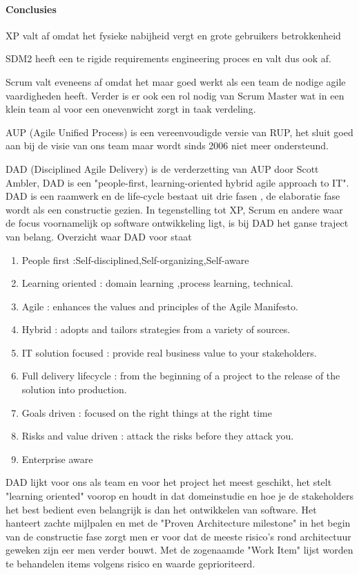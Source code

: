	
\paragraph{Conclusies}
\begin{description}
\item XP valt af omdat het fysieke nabijheid vergt en grote gebruikers betrokkenheid
\item SDM2 heeft een te rigide requirements engineering proces en valt dus ook af.
\item Scrum valt eveneens af omdat het maar goed werkt als een team de nodige agile vaardigheden heeft. Verder is er ook een rol nodig van Scrum Master wat in een klein team al voor een onevenwicht zorgt in taak verdeling.
\item AUP (Agile Unified Process) is een vereenvoudigde versie van RUP, het sluit goed aan bij de visie van ons team maar wordt sinds 2006 niet meer ondersteund. 
\item DAD (Disciplined Agile Delivery) is de verderzetting van AUP door Scott Ambler, DAD is een "people-first, learning-oriented hybrid agile approach to IT". DAD is een raamwerk en de life-cycle bestaat uit drie fasen , de elaboratie fase wordt als een constructie gezien. In tegenstelling tot XP, Scrum en andere waar de focus voornamelijk op software ontwikkeling ligt, is bij DAD het ganse traject van belang.
Overzicht waar DAD voor staat 
	\begin{enumerate}
		\item People first :Self-disciplined,Self-organizing,Self-aware
		\item Learning oriented : domain learning ,process learning, technical.
		\item Agile : enhances the values and principles of the Agile Manifesto.
		\item Hybrid : adopts and tailors strategies from a variety of sources.
		\item IT solution focused :  provide real business value to your stakeholders.
		\item Full delivery lifecycle : from the beginning of a project to the release of the solution into production.
		\item Goals driven : focused on the right things at the right time
		\item Risks and value driven : attack the risks before they attack you.
		\item Enterprise aware
	\end{enumerate}
	

DAD lijkt voor ons als team en voor het project het meest geschikt, het stelt
"learning oriented" voorop en houdt in dat domeinstudie en hoe je de stakeholders het best bedient even belangrijk is dan het ontwikkelen van software. Het hanteert zachte mijlpalen en met de "Proven Architecture milestone" in het begin van de constructie fase zorgt men er voor dat de meeste risico's rond architectuur geweken zijn eer men verder bouwt. Met de zogenaamde "Work Item" lijst worden te behandelen items volgens risico en waarde geprioriteerd.

\end{description}





